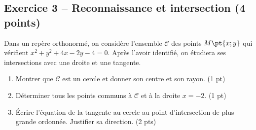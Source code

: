 \subsection*{Exercice 3 -- Reconnaissance et intersection (4 points)}
Dans un repère orthonormé, on considère l’ensemble $\mathcal C$ des points $M\pt{x;y}$ qui vérifient $x^2+y^2+4x-2y-4=0$. Après l’avoir identifié, on étudiera ses intersections avec une droite et une tangente.
\begin{enumerate}
\item Montrer que $\mathcal C$ est un cercle et donner son centre et son rayon. \hfill(1 pt)
\item Déterminer tous les points communs à $\mathcal C$ et à la droite $x=-2$. \hfill(1 pt)
\item Écrire l’équation de la tangente au cercle au point d’intersection de plus grande ordonnée. Justifier sa direction. \hfill(2 pts)
\end{enumerate}
